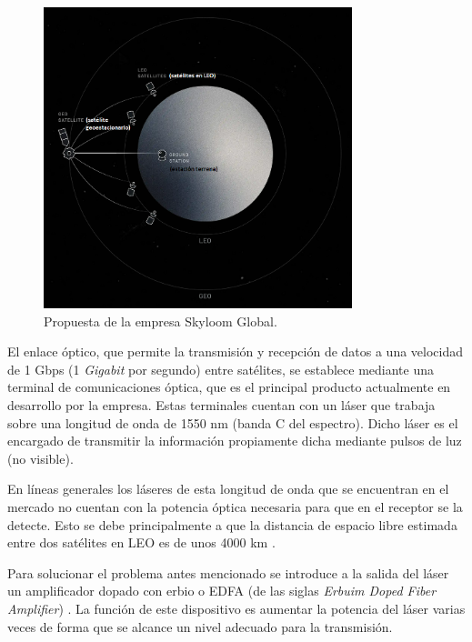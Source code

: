 \begin{figure}[H]
\centering
\includegraphics[width=0.8\textwidth]{./Figures/propuesta_skyloom.png}
\caption{Propuesta de la empresa Skyloom Global\protect\footnotemark.}
\label{fig:propSky}
\end{figure}


El enlace óptico, que permite la transmisión y recepción de datos a una velocidad de 1 Gbps (1 \textit{Gigabit} por segundo) entre satélites, se establece mediante una terminal de comunicaciones óptica, que es el principal producto actualmente en desarrollo por la empresa. Estas terminales cuentan con un láser que trabaja sobre una longitud de onda de 1550 nm (banda C del espectro). Dicho láser es el encargado de transmitir la información propiamente dicha mediante pulsos de luz (no visible).

En líneas generales los láseres de esta longitud de onda que se encuentran en el mercado no cuentan con la potencia óptica necesaria para que en el receptor se la detecte. Esto se debe principalmente a que la distancia de espacio libre estimada entre dos satélites en LEO es de unos 4000 km \citep{WEBSITE_SKY}.

Para solucionar el problema antes mencionado se introduce a la salida del láser un amplificador dopado con erbio o EDFA (de las siglas \textit{Erbuim Doped Fiber Amplifier}) \citep{WEBSITE:EDFA2}. La función de este dispositivo es aumentar la potencia del láser varias veces de forma que se alcance un nivel adecuado para la transmisión.

